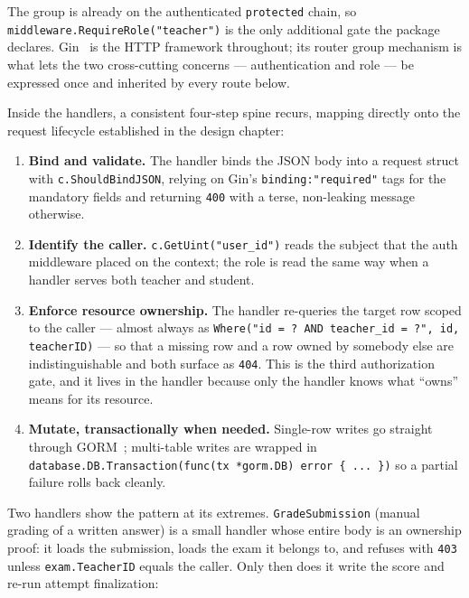 The group is already on the authenticated \texttt{protected} chain, so
\texttt{middleware.RequireRole("teacher")} is the only additional gate the
package declares. Gin~\cite{gin} is the HTTP framework throughout; its router
group mechanism is what lets the two cross-cutting concerns --- authentication
and role --- be expressed once and inherited by every route below.

Inside the handlers, a consistent four-step spine recurs, mapping directly onto
the request lifecycle established in the design chapter:

\begin{enumerate}
  \item \textbf{Bind and validate.} The handler binds the JSON body into a
    request struct with \texttt{c.ShouldBindJSON}, relying on Gin's
    \texttt{binding:"required"} tags for the mandatory fields and returning
    \texttt{400} with a terse, non-leaking message otherwise.
  \item \textbf{Identify the caller.} \texttt{c.GetUint("user\_id")} reads the
    subject that the auth middleware placed on the context; the role is read the
    same way when a handler serves both teacher and student.
  \item \textbf{Enforce resource ownership.} The handler re-queries the target
    row scoped to the caller --- almost always as
    \texttt{Where("id = ? AND teacher\_id = ?", id, teacherID)} --- so that a
    missing row and a row owned by somebody else are indistinguishable and both
    surface as \texttt{404}. This is the third authorization gate, and it lives
    in the handler because only the handler knows what ``owns'' means for its
    resource.
  \item \textbf{Mutate, transactionally when needed.} Single-row writes go
    straight through GORM~\cite{gorm}; multi-table writes are wrapped in
    \texttt{database.DB.Transaction(func(tx *gorm.DB) error \{ ... \})} so a
    partial failure rolls back cleanly.
\end{enumerate}

Two handlers show the pattern at its extremes. \texttt{GradeSubmission} (manual
grading of a written answer) is a small handler whose entire body is an
ownership proof: it loads the submission, loads the exam it belongs to, and
refuses with \texttt{403} unless \texttt{exam.TeacherID} equals the caller.
Only then does it write the score and re-run attempt finalization:

